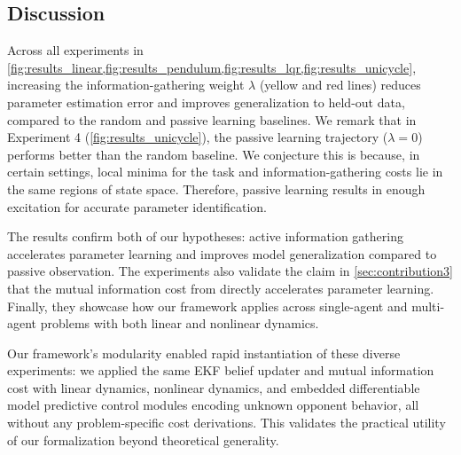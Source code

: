 \subsection{Discussion}
Across all experiments in \cref{fig:results_linear,fig:results_pendulum,fig:results_lqr,fig:results_unicycle}, increasing the information-gathering weight $\lambda$ (yellow and red lines) reduces parameter estimation error and improves generalization to held-out data, compared to the random and passive learning baselines.
We remark that in Experiment 4 (\cref{fig:results_unicycle}), the passive learning trajectory ($\lambda = 0$) performs better than the random baseline. 
We conjecture this is because, in certain settings, local minima for the task and information-gathering costs lie in the same regions of state space. 
Therefore, passive learning results in enough excitation for accurate parameter identification.

The results confirm both of our hypotheses: active information gathering accelerates parameter learning and improves model generalization compared to passive observation.
The experiments also validate the claim in \cref{sec:contribution3} that the mutual information cost from  directly accelerates parameter learning.
Finally, they showcase how our framework applies across single-agent and multi-agent problems with both linear and nonlinear dynamics.

Our framework's modularity enabled rapid instantiation of these diverse experiments: we applied the same EKF belief updater and mutual information cost with linear dynamics, nonlinear dynamics, and embedded differentiable model predictive control modules encoding unknown opponent behavior, all without any problem-specific cost derivations.
This validates the practical utility of our formalization beyond theoretical generality.


